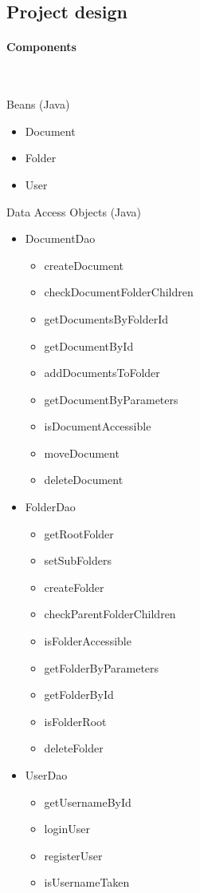 \documentclass[a4paper,12pt]{article}
\newcommand{\myparagraph}[1]{\paragraph{#1}\mbox{}\\}
\begin{document}
\subsection{Project design}
\myparagraph{Components}
\begin{multicols}{2}
Beans (Java)
\begin{itemize}
	\item{Document}
	\item{Folder}
	\item{User}
\end{itemize}
Data Access Objects (Java)
\begin{itemize}
	\item{DocumentDao}
	\begin{itemize}
		\item{createDocument}
		\item{checkDocumentFolderChildren}
		\item{getDocumentsByFolderId}
		\item{getDocumentById}
		\item{addDocumentsToFolder}
		\item{getDocumentByParameters}
		\item{isDocumentAccessible}
		\item{moveDocument}
		\item{deleteDocument}
	\end{itemize}
	\item{FolderDao}
	\begin{itemize}
		\item{getRootFolder}
		\item{setSubFolders}
		\item{createFolder}
		\item{checkParentFolderChildren}
		\item{isFolderAccessible}
		\item{getFolderByParameters}
		\item{getFolderById}
		\item{isFolderRoot}
		\item{deleteFolder}
	\end{itemize}
	\item{UserDao}
	\begin{itemize}
		\item{getUsernameById}
		\item{loginUser}
		\item{registerUser}
		\item{isUsernameTaken}
	\end{itemize}

\end{itemize}
\end{multicols}
\end{document}
